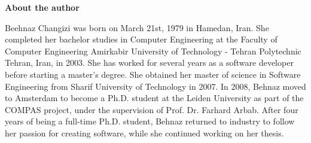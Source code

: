 \newpage
{\textbf{\Large{About the author}}}
\vspace*{1cm}

Beehnaz Changizi was born on March 21st, 1979 in Hamedan, Iran. She completed
her bachelor studies in Computer Engineering at the Faculty of Computer Engineering Amirkabir University of Technology - Tehran Polytechnic Tehran, Iran, in 2003. She has worked for several years as a software developer before starting a master's degree. She obtained her master of science in Software Engineering from Sharif University of Technology in 2007.
In 2008, Behnaz moved to Amsterdam to become a Ph.D. student at the
Leiden University as part of the COMPAS project, under the supervision of Prof. Dr. Farhard Arbab. After four years of being a full-time Ph.D. student, Behnaz returned to industry to follow her passion for creating software, while she continued working on her thesis.
